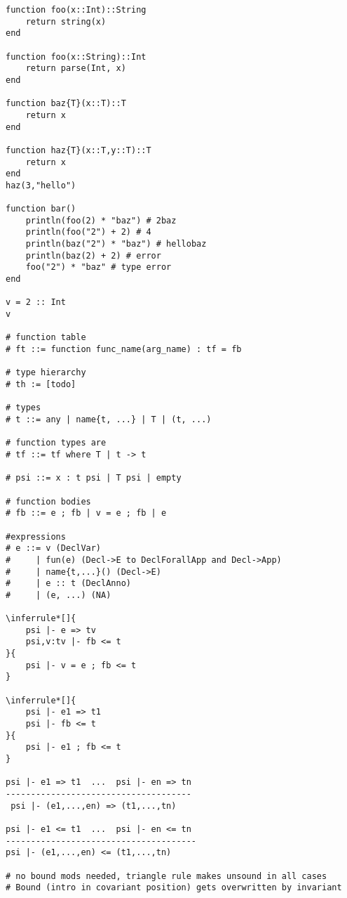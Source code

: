 \documentclass{report} %
\begin{document}


\begin{verbatim}
function foo(x::Int)::String
	return string(x)
end

function foo(x::String)::Int
	return parse(Int, x)
end

function baz{T}(x::T)::T
    return x
end

function haz{T}(x::T,y::T)::T
	return x
end
haz(3,"hello")

function bar()
    println(foo(2) * "baz") # 2baz
    println(foo("2") + 2) # 4
    println(baz("2") * "baz") # hellobaz
    println(baz(2) + 2) # error
    foo("2") * "baz" # type error
end

v = 2 :: Int
v

# function table
# ft ::= function func_name(arg_name) : tf = fb

# type hierarchy
# th := [todo]

# types
# t ::= any | name{t, ...} | T | (t, ...)

# function types are
# tf ::= tf where T | t -> t

# psi ::= x : t psi | T psi | empty

# function bodies
# fb ::= e ; fb | v = e ; fb | e

#expressions
# e ::= v (DeclVar)
#     | fun(e) (Decl->E to DeclForallApp and Decl->App)
#     | name{t,...}() (Decl->E)
#     | e :: t (DeclAnno)
#     | (e, ...) (NA)

\inferrule*[]{
	psi |- e => tv
	psi,v:tv |- fb <= t
}{
	psi |- v = e ; fb <= t
}

\inferrule*[]{
	psi |- e1 => t1
	psi |- fb <= t
}{
	psi |- e1 ; fb <= t
}

psi |- e1 => t1  ...  psi |- en => tn
-------------------------------------
 psi |- (e1,...,en) => (t1,...,tn)

psi |- e1 <= t1  ...  psi |- en <= tn
--------------------------------------
psi |- (e1,...,en) <= (t1,...,tn)

# no bound mods needed, triangle rule makes unsound in all cases
# Bound (intro in covariant position) gets overwritten by invariant

\end{verbatim}
\end{document}
